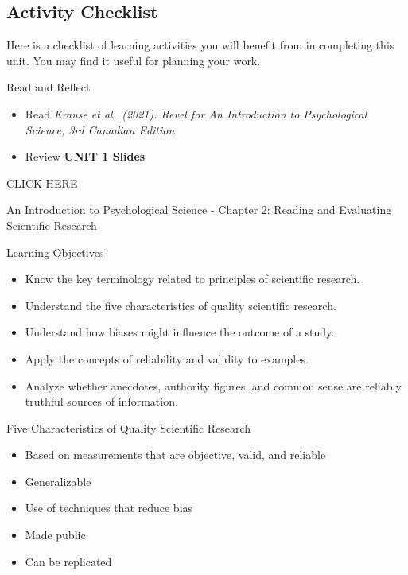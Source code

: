 \documentclass[
]{book}
\providecommand{\tightlist}{%
  \setlength{\itemsep}{0pt}\setlength{\parskip}{0pt}}
\begin{document}
\hypertarget{activity-checklist}{%
\subsection*{Activity Checklist}\label{activity-checklist}}

Here is a checklist of learning activities you will benefit from in completing this unit. You may find it useful for planning your work.

\begin{reflect}
{Read and Reflect}

\begin{itemize}
\tightlist
\item
  Read \emph{Krause et al.~(2021). Revel for An Introduction to Psychological Science, 3rd Canadian Edition}\\
\item
  Review \textbf{UNIT 1 Slides}
\end{itemize}

CLICK HERE

An Introduction to Psychological Science - Chapter 2: Reading and Evaluating Scientific Research

Learning Objectives

\begin{itemize}
\tightlist
\item
  Know the key terminology related to principles of scientific research.\\
\item
  Understand the five characteristics of quality scientific research.\\
\item
  Understand how biases might influence the outcome of a study.\\
\item
  Apply the concepts of reliability and validity to examples.\\
\item
  Analyze whether anecdotes, authority figures, and common sense are reliably truthful sources of information.
\end{itemize}

Five Characteristics of Quality Scientific Research

\begin{itemize}
\tightlist
\item
  Based on measurements that are objective, valid, and reliable\\
\item
  Generalizable\\
\item
  Use of techniques that reduce bias\\
\item
  Made public\\
\item
  Can be replicated
\end{itemize}


\end{reflect}
\end{document}
